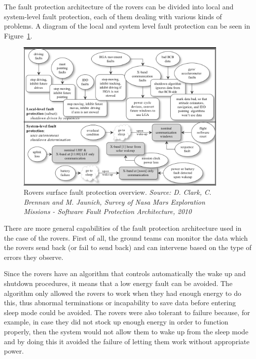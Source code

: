 The fault protection architecture of the rovers can be divided into local and
system-level fault protection, each of them dealing with various kinds of
problems\cite{fprot}. A diagram of the local and system level fault protection
can be seen in Figure~\ref{fig:rovers}.

\begin{figure}[htb]
	\begin{center}
	\includegraphics[width=0.92\textwidth]{img/rovers.png}
	\caption{Rovers surface fault protection overview. \small{\textit{ Source: D.
	Clark, C. Brennan and M. Jaunich, Survey of Nasa Mars Exploration Missions -
	Software Fault Protection Architecture, 2010}}}
	\label{fig:rovers}
	\end{center}
\end{figure}

There are more general capabilities of the fault protection architecture used in
the case of the rovers. First of all, the ground teams can monitor the data
which the rovers send back (or fail to send back) and can intervene based on the
type of errors they observe.

Since the rovers have an algorithm that controls automatically the wake up and
shutdown procedures, it means that a low energy fault can be avoided. The
algorithm only allowed the rovers to work when they had enough energy to do
this, thus abnormal terminations or incapability to save data before entering
sleep mode could be avoided. The rovers were also tolerant to failure because,
for example, in case they did not stock up enough energy in order to function
properly, then the system would not allow them to wake up from the sleep mode
and by doing this it avoided the failure of letting them work without
appropriate power.

